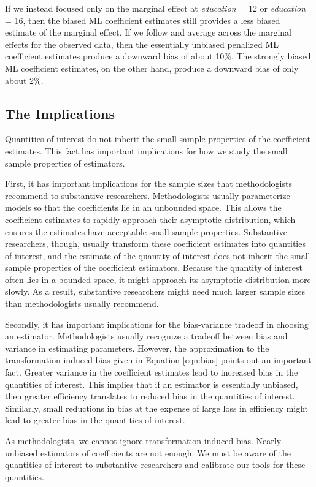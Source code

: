 \documentclass[12pt]{article}
\begin{document}
If we instead focused only on the marginal effect at \textit{education} = 12 or \textit{education} = 16, then the biased ML coefficient estimates still provides a less biased estimate of the marginal effect. 
If we follow \cite{HanmerKalkan2013} and average across the marginal effects for the observed data, then the essentially unbiased penalized ML coefficient estimates produce a downward bias of about 10\%. 
The strongly biased ML coefficient estimates, on the other hand, produce a downward bias of only about 2\%.

\subsection*{The Implications}

Quantities of interest do not inherit the small sample properties of the coefficient estimates.
This fact has important implications for how we study the small sample properties of estimators. 

First, it has important implications for the sample sizes that methodologists recommend to substantive researchers. 
Methodologists usually parameterize models so that the coefficients lie in an unbounded space. 
This allows the coefficient estimates to rapidly approach their asymptotic distribution, which ensures the estimates have acceptable small sample properties. 
Substantive researchers, though, usually transform these coefficient estimates into quantities of interest, and the estimate of the quantity of interest does not inherit the small sample properties of the coefficient estimators. 
Because the quantity of interest often lies in a bounded space, it might approach its asymptotic distribution more slowly. 
As a result, substantive researchers might need much larger sample sizes than methodologists usually recommend.

Secondly, it has important implications for the bias-variance tradeoff in choosing an estimator. 
Methodologists usually recognize a tradeoff between bias and variance in estimating parameters. 
However, the approximation to the transformation-induced bias given in Equation \ref{eqn:bias} points out an important fact. 
Greater variance in the coefficient estimates lead to increased bias in the quantities of interest. 
This implies that if an estimator is essentially unbiased, then greater efficiency translates to reduced bias in the quantities of interest. 
Similarly, small reductions in bias at the expense of large loss in efficiency might lead to greater bias in the quantities of interest. 

As methodologists, we cannot ignore transformation induced bias. Nearly unbiased estimators of coefficients are not enough. We must be aware of the quantities of interest to substantive researchers and calibrate our tools for these quantities.

\singlespace 
\small


\end{document}
